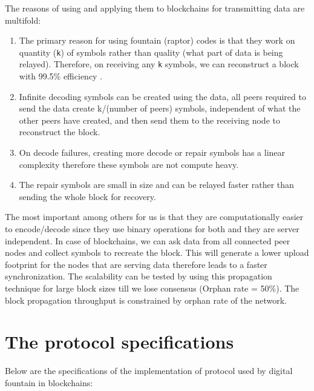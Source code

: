 The reasons of using and applying them to blockchains for transmitting data are
multifold:

\begin{enumerate}
    \item The primary reason for using fountain (raptor) codes is
     that they work on quantity (\texttt{k}) of symbols rather than quality (what part of data is being relayed). Therefore, on receiving any \texttt{k} symbols, we can reconstruct a block with 99.5\% efficiency \citep{fountain-pres} .
     
    \item Infinite decoding symbols can be created using the data, all
        peers required to send the data create k/(number of peers) symbols, independent of what the
        other peers have created, and then send them to the receiving node to
        reconstruct the block.
    \item On decode failures, creating more decode or repair symbols has a
        linear complexity therefore these symbols are not compute heavy.
    \item The repair symbols are small in size and can be relayed faster rather
        than sending the whole block for recovery. 
\end{enumerate}

The most important among others for us is that they are computationally easier to
encode/decode since they use binary operations for both and they are server independent. In case
of blockchains, we can ask data from all connected peer nodes and
collect symbols to recreate the block. This will generate a lower upload
footprint for the nodes that are serving data therefore leads to a faster
synchronization. 
The scalability can be tested by using this propagation technique for large block sizes till 
we lose consensus (Orphan rate = 50\%). The block propagation throughput is constrained by orphan rate of the network.

\section{The protocol specifications}

Below are the specifications of the implementation of protocol used by digital
fountain in blockchains:

